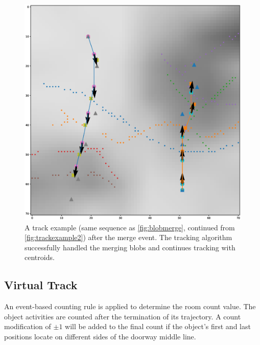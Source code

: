 \begin{figure}
  \centering
  \includegraphics[width=\textwidth]{figures/trackexample2_2.eps}
  \caption{A track example (same sequence as \autoref{fig:blobmerge}, continued from \autoref{fig:trackexample2}) after the merge event. The tracking algorithm successfully handled the merging blobs and continues tracking with centroids.}\label{fig:trackexample2_2}
\end{figure}

\subsection{Virtual Track}
An event-based counting rule is applied to determine the room count value. The object activities are counted after the termination of its trajectory. A count modification of $\pm 1$ will be added to the final count if the object's first and last positions locate on different sides of the doorway middle line.

